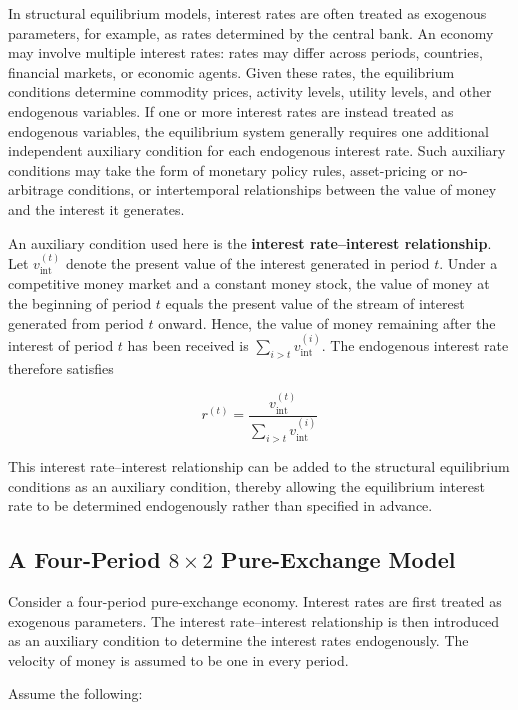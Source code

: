 \documentclass[
  letterpaper,
  DIV=11,
  numbers=noendperiod]{scrreprt}
\begin{document}
In structural equilibrium models, interest rates are often treated as
exogenous parameters, for example, as rates determined by the central
bank. An economy may involve multiple interest rates: rates may differ
across periods, countries, financial markets, or economic agents. Given
these rates, the equilibrium conditions determine commodity prices,
activity levels, utility levels, and other endogenous variables. If one
or more interest rates are instead treated as endogenous variables, the
equilibrium system generally requires one additional independent
auxiliary condition for each endogenous interest rate. Such auxiliary
conditions may take the form of monetary policy rules, asset-pricing or
no-arbitrage conditions, or intertemporal relationships between the
value of money and the interest it generates.

An auxiliary condition used here is the \textbf{interest rate--interest
relationship}. Let \(v_{\mathrm{int}}^{(t)}\) denote the present value
of the interest generated in period \(t\). Under a competitive money
market and a constant money stock, the value of money at the beginning
of period \(t\) equals the present value of the stream of interest
generated from period \(t\) onward. Hence, the value of money remaining
after the interest of period \(t\) has been received is
\(\sum_{i>t}v_{\mathrm{int}}^{(i)}\). The endogenous interest rate
therefore satisfies

\[
r^{(t)}
=
\frac{v_{\mathrm{int}}^{(t)}}
{\displaystyle\sum_{i>t}v_{\mathrm{int}}^{(i)}}
\]

This interest rate--interest relationship can be added to the structural
equilibrium conditions as an auxiliary condition, thereby allowing the
equilibrium interest rate to be determined endogenously rather than
specified in advance.

\subsection{\texorpdfstring{A Four-Period \(8\times2\) Pure-Exchange
Model}{A Four-Period 8\textbackslash times2 Pure-Exchange Model}}\label{a-four-period-8times2-pure-exchange-model}

Consider a four-period pure-exchange economy. Interest rates are first
treated as exogenous parameters. The interest rate--interest
relationship is then introduced as an auxiliary condition to determine
the interest rates endogenously. The velocity of money is assumed to be
one in every period.

Assume the following:
\end{document}
